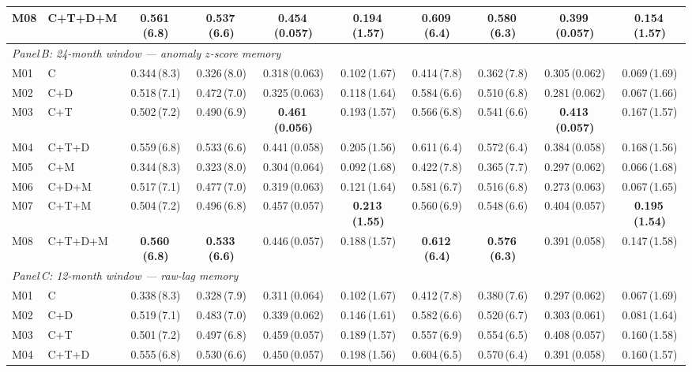\begin{table}
\begin{tabular}{@{}llcccccccc@{}}
M08 & C+T+D+M & \textbf{0.561\,(6.8)} & \textbf{0.537\,(6.6)} & 0.454\,(0.057) & 0.194\,(1.57) & \textbf{0.609\,(6.4)} & \textbf{0.580\,(6.3)} & 0.399\,(0.057) & 0.154\,(1.57) \\
\midrule
\multicolumn{10}{l}{\textit{Panel\,B: 24-month window --- anomaly $z$-score memory}} \\
\midrule
M01 & C & 0.344\,(8.3) & 0.326\,(8.0) & 0.318\,(0.063) & 0.102\,(1.67) & 0.414\,(7.8) & 0.362\,(7.8) & 0.305\,(0.062) & 0.069\,(1.69) \\
M02 & C+D & 0.518\,(7.1) & 0.472\,(7.0) & 0.325\,(0.063) & 0.118\,(1.64) & 0.584\,(6.6) & 0.510\,(6.8) & 0.281\,(0.062) & 0.067\,(1.66) \\
M03 & C+T & 0.502\,(7.2) & 0.490\,(6.9) & \textbf{0.461\,(0.056)} & 0.193\,(1.57) & 0.566\,(6.8) & 0.541\,(6.6) & \textbf{0.413\,(0.057)} & 0.167\,(1.57) \\
M04 & C+T+D & 0.559\,(6.8) & 0.533\,(6.6) & 0.441\,(0.058) & 0.205\,(1.56) & 0.611\,(6.4) & 0.572\,(6.4) & 0.384\,(0.058) & 0.168\,(1.56) \\
M05 & C+M & 0.344\,(8.3) & 0.323\,(8.0) & 0.304\,(0.064) & 0.092\,(1.68) & 0.422\,(7.8) & 0.365\,(7.7) & 0.297\,(0.062) & 0.066\,(1.68) \\
M06 & C+D+M & 0.517\,(7.1) & 0.477\,(7.0) & 0.319\,(0.063) & 0.121\,(1.64) & 0.581\,(6.7) & 0.516\,(6.8) & 0.273\,(0.063) & 0.067\,(1.65) \\
M07 & C+T+M & 0.504\,(7.2) & 0.496\,(6.8) & 0.457\,(0.057) & \textbf{0.213\,(1.55)} & 0.560\,(6.9) & 0.548\,(6.6) & 0.404\,(0.057) & \textbf{0.195\,(1.54)} \\
M08 & C+T+D+M & \textbf{0.560\,(6.8)} & \textbf{0.533\,(6.6)} & 0.446\,(0.057) & 0.188\,(1.57) & \textbf{0.612\,(6.4)} & \textbf{0.576\,(6.3)} & 0.391\,(0.058) & 0.147\,(1.58) \\
\midrule
\multicolumn{10}{l}{\textit{Panel\,C: 12-month window --- raw-lag memory}} \\
\midrule
M01 & C & 0.338\,(8.3) & 0.328\,(7.9) & 0.311\,(0.064) & 0.102\,(1.67) & 0.412\,(7.8) & 0.380\,(7.6) & 0.297\,(0.062) & 0.067\,(1.69) \\
M02 & C+D & 0.519\,(7.1) & 0.483\,(7.0) & 0.339\,(0.062) & 0.146\,(1.61) & 0.582\,(6.6) & 0.520\,(6.7) & 0.303\,(0.061) & 0.081\,(1.64) \\
M03 & C+T & 0.501\,(7.2) & 0.497\,(6.8) & 0.459\,(0.057) & 0.189\,(1.57) & 0.557\,(6.9) & 0.554\,(6.5) & 0.408\,(0.057) & 0.160\,(1.58) \\
M04 & C+T+D & 0.555\,(6.8) & 0.530\,(6.6) & 0.450\,(0.057) & 0.198\,(1.56) & 0.604\,(6.5) & 0.570\,(6.4) & 0.391\,(0.058) & 0.160\,(1.57) \\

\end{tabular}
\end{table}
